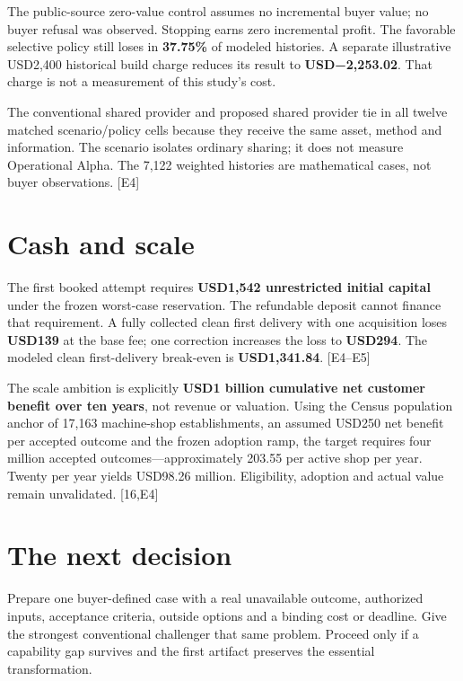 \documentclass[10pt,letterpaper]{article}
\begin{document}
The public-source zero-value control assumes no incremental buyer value; no buyer refusal was observed. Stopping earns zero incremental profit. The favorable selective policy still loses in \textbf{37.75\%} of modeled histories. A separate illustrative USD2,400 historical build charge reduces its result to \textbf{USD−2,253.02}. That charge is not a measurement of this study's cost.

The conventional shared provider and proposed shared provider tie in all twelve matched scenario/policy cells because they receive the same asset, method and information. The scenario isolates ordinary sharing; it does not measure Operational Alpha. The 7,122 weighted histories are mathematical cases, not buyer observations. {[}E4{]}

\hypertarget{cash-and-scale}{%
\section{Cash and scale}\label{cash-and-scale}}

The first booked attempt requires \textbf{USD1,542 unrestricted initial capital} under the frozen worst-case reservation. The refundable deposit cannot finance that requirement. A fully collected clean first delivery with one acquisition loses \textbf{USD139} at the base fee; one correction increases the loss to \textbf{USD294}. The modeled clean first-delivery break-even is \textbf{USD1,341.84}. {[}E4--E5{]}

The scale ambition is explicitly \textbf{USD1 billion cumulative net customer benefit over ten years}, not revenue or valuation. Using the Census population anchor of 17,163 machine-shop establishments, an assumed USD250 net benefit per accepted outcome and the frozen adoption ramp, the target requires four million accepted outcomes---approximately 203.55 per active shop per year. Twenty per year yields USD98.26 million. Eligibility, adoption and actual value remain unvalidated. {[}16,E4{]}

\hypertarget{the-next-decision}{%
\section{The next decision}\label{the-next-decision}}

Prepare one buyer-defined case with a real unavailable outcome, authorized inputs, acceptance criteria, outside options and a binding cost or deadline. Give the strongest conventional challenger that same problem. Proceed only if a capability gap survives and the first artifact preserves the essential transformation.
\end{document}
